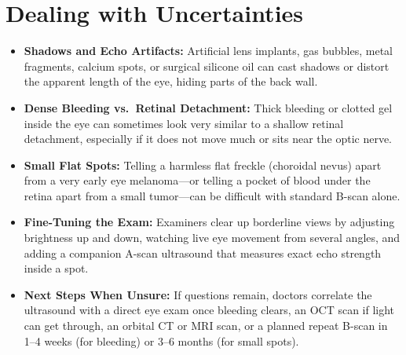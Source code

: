 \section{Dealing with Uncertainties}
\begin{itemize}
    \item \textbf{Shadows and Echo Artifacts:} Artificial lens implants, gas bubbles, metal fragments, calcium spots, or surgical silicone oil can cast shadows or distort the apparent length of the eye, hiding parts of the back wall.
    \item \textbf{Dense Bleeding vs.\ Retinal Detachment:} Thick bleeding or clotted gel inside the eye can sometimes look very similar to a shallow retinal detachment, especially if it does not move much or sits near the optic nerve.
    \item \textbf{Small Flat Spots:} Telling a harmless flat freckle (choroidal nevus) apart from a very early eye melanoma---or telling a pocket of blood under the retina apart from a small tumor---can be difficult with standard B-scan alone.
    \item \textbf{Fine-Tuning the Exam:} Examiners clear up borderline views by adjusting brightness up and down, watching live eye movement from several angles, and adding a companion A-scan ultrasound that measures exact echo strength inside a spot.
    \item \textbf{Next Steps When Unsure:} If questions remain, doctors correlate the ultrasound with a direct eye exam once bleeding clears, an OCT scan if light can get through, an orbital CT or MRI scan, or a planned repeat B-scan in 1--4 weeks (for bleeding) or 3--6 months (for small spots).
\end{itemize}

